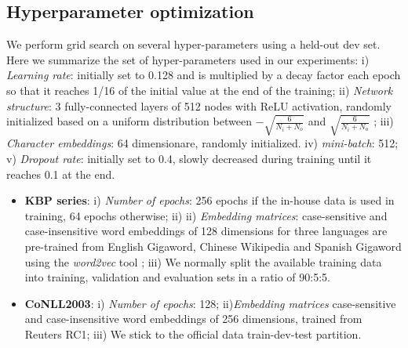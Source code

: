 \documentclass[11pt,a4paper]{article}
\begin{document}
\subsection{Hyperparameter optimization}

We perform grid search on several hyper-parameters using a held-out dev set. Here we summarize the set of hyper-parameters used in our experiments:
i) {\it Learning rate}: initially set to 0.128 and is multiplied by a decay factor each epoch so that it reaches 1/16 of the initial value at the end of the training;
ii) {\it Network structure}: 3 fully-connected layers of 512 nodes with ReLU activation, randomly initialized based on a uniform distribution between $-\sqrt{\frac{6}{N_i + N_o}}$  and $\sqrt{\frac{6}{N_i + N_o}}$ \cite{glorot2011deep};
iii) {\it Character embeddings}: 64 dimensionare, randomly initialized.
iv) {\it mini-batch}: 512;
v) {\it Dropout rate}: initially set to 0.4, slowly decreased during training until it reaches 0.1 at the end.



\begin{itemize}
	\item \textbf{KBP series}:
	i) {\it Number of epochs}: 256 epochs if the in-house data is used in training, 64 epochs otherwise; ii)
	ii) {\it Embedding matrices}: 
	case-sensitive and case-insensitive word embeddings of 128 dimensions for three languages are pre-trained from English Gigaword, Chinese Wikipedia and Spanish Gigaword using the {\em word2vec} tool \cite{mikolov2013distributed};
	iii) We normally split the available training data into training, validation and evaluation sets in a ratio of 90:5:5.
	
	\item \textbf{CoNLL2003}:
	i) {\it Number of epochs}: 128;
	ii){\it Embedding matrices} case-sensitive and case-insensitive word embeddings of 256 dimensions, trained from Reuters RC1;
	iii) We stick to the official data train-dev-test partition.  
\end{itemize}
\end{document}
